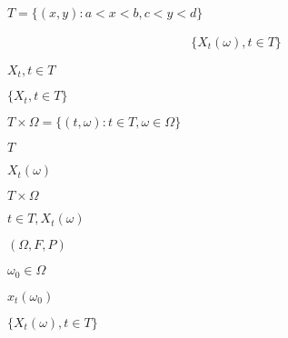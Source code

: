 \begin{preview}
\setcounter{equation}{0}%
\(T = \{(x, y): a < x < b, c < y < d\}\)
\end{preview}

\begin{preview}
\setcounter{equation}{0}%
\begin{align}
\{X_t(\omega), t \in T\}
\end{align}

\end{preview}

\begin{preview}
\setcounter{equation}{0}%
\(X_t, t \in T\)
\end{preview}

\begin{preview}
\setcounter{equation}{0}%
\(\{X_t, t \in T\}\)
\end{preview}

\begin{preview}
\setcounter{equation}{0}%
\(T \times \Omega = \{(t, \omega): t\in T, \omega \in \Omega\}\)
\end{preview}

\begin{preview}
\setcounter{equation}{0}%
\(T\)
\end{preview}

\begin{preview}
\setcounter{equation}{0}%
\(X_t(\omega)\)
\end{preview}

\begin{preview}
\setcounter{equation}{0}%
\(T \times \Omega\)
\end{preview}

\begin{preview}
\setcounter{equation}{0}%
\(t \in T, X_t(\omega)\)
\end{preview}

\begin{preview}
\setcounter{equation}{0}%
\((\Omega, F, P)\)
\end{preview}

\begin{preview}
\setcounter{equation}{0}%
\(\omega_0 \in \Omega\)
\end{preview}

\begin{preview}
\setcounter{equation}{0}%
\(x_t(\omega_0)\)
\end{preview}

\begin{preview}
\setcounter{equation}{0}%
\(\{X_t(\omega), t \in T\}\)
\end{preview}

